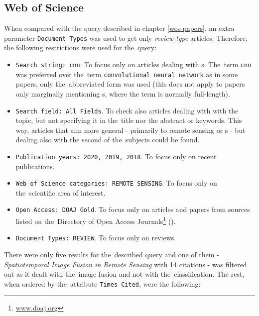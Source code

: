 \subsection{Web of Science}
\label{wos-reviews}

When compared with the query described in chapter \ref{wos-papers}, an extra parameter \verb|Document Types| was used to get only \textit{review-type} articles. Therefore, the following restrictions were used for the~query:

\begin{itemize}
	\item \verb|Search string: cnn|. To focus only on articles dealing with s. The~term \verb|cnn| was preferred over the~term \verb|convolutional neural network| as in some papers, only the~abbreviated form was used (this does not apply to papers only marginally mentioning s, where the term is normally full-length).
	\item \verb|Search field: All Fields|. To check also articles dealing with with the topic, but not specifying it in the~title nor the abstract or keywords. This way, articles that aim more general - primarily to remote sensing or s - but dealing also with the second of the~subjects could be found.
	\item \verb|Publication years: 2020, 2019, 2018|. To focus only on recent publications.
	\item \verb|Web of Science categories: REMOTE SENSING|. To focus only on the~scien\-ti\-fic area of interest.
	\item \verb|Open Access: DOAJ Gold|. To focus only on articles and papers from sources listed on the~Di\-rectory of Open Access Journals\footnote{\url{www.doaj.org}} ().
	\item \verb|Document Types: REVIEW|. To focus only on reviews.
\end{itemize}

\noindent There were only five results for the~described query and one of them - \textit{Spatiotemporal Image Fusion in Remote Sensing} \cite{review-st-fusion} with 14 citations - was filtered out as it dealt with the~image fusion and not with the~classification. The rest, when ordered by the~attribute \verb|Times Cited|, were the following:


